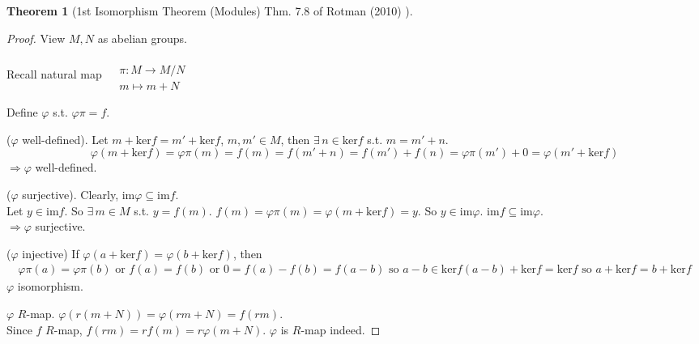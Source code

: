\documentclass[10pt]{amsart}
\newtheorem{theorem}{Theorem}
\begin{document}
\begin{multicols*}{2}
\begin{theorem}[1st Isomorphism Theorem (Modules) Thm. 7.8 of Rotman (2010) \cite{JRotman2010}]
\end{theorem}

\begin{proof}
	View $M,N$ as abelian groups.  

Recall natural map $ \begin{aligned} & \quad \\ 
	& \pi : M \to M/N \\
& m\mapsto m + N \end{aligned}$  

Define $\varphi$ s.t. $\varphi \pi = f$.  

($\varphi$ well-defined).  Let $m+\text{ker}f = m' + \text{ker}f$, $m,m' \in M$, then $\exists \,  n \in \text{ker}f$ s.t. $m=m'+n$.  
\[
\varphi(m+\text{ker}f) = \varphi\pi (m) = f(m) = f(m' +n ) = f(m') + f(n) = \varphi \pi(m') + 0 = \varphi(m' + \text{ker}f )
\]
$\Longrightarrow \varphi $ well-defined.  

($\varphi$ surjective).  Clearly, $\text{im}\varphi \subseteq  \text{im} f$.   \\
Let $y\in \text{im}f$.  So $\exists \,  m \in M$ s.t. $y=f(m)$.  $f(m) = \varphi \pi (m) = \varphi(m+\text{ker}f) = y$.  So $y\in \text{im}\varphi$.  $\text{im}f\subseteq \text{im}\varphi$.  \\
$\Longrightarrow \varphi $ surjective.  

($\varphi$ injective)  If $\varphi(a+\text{ker}f) = \varphi(b+\text{ker}f)$, then 
\[
\begin{gathered}
\varphi\pi(a) = \varphi\pi(b) \text{ or } f(a) = f(b) \text{ or } 0 = f(a) -f(b) = f(a-b) \text{ so } a-b \in \text{ker}f
	(a-b) + \text{ker}f = \text{ker}f \text{ so } a + \text{ker}f = b +\text{ker}f 
\end{gathered}
\]
$\varphi$ isomorphism.  

$\varphi$ $R$-map.  $\varphi(r(m+N)) = \varphi(rm+N) = f(rm)$.    \\
Since $f$ $R$-map, $f(rm) = rf(m) = r\varphi(m+N)$.  $\varphi$ is $R$-map indeed.  


\end{proof}



\end{multicols*}
\end{document}
